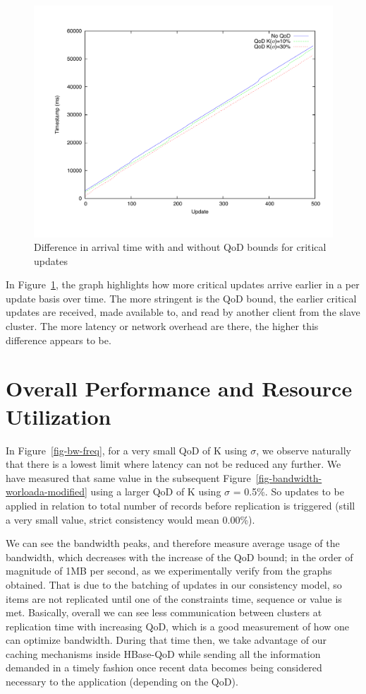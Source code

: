 \begin{figure}[b]
\centering
\includegraphics[width=1.0\textwidth]{figs/timestamps-critical-updates.pdf}
\caption{Difference in arrival time with and without QoD bounds for critical updates}
\label{fig-timestamps-critical-updates}
\end{figure}

In Figure~\ref{fig-timestamps-critical-updates}, the graph highlights how more critical updates arrive earlier in a per update basis over time. The more stringent is the QoD bound, the earlier critical updates are received, made available to, and read by another client from the slave cluster. The more latency or network overhead are there, the higher this difference appears to be.

\section{Overall Performance and Resource Utilization}

In Figure~\ref{fig-bw-freq}, for a very small QoD of K using $\sigma$, we observe naturally that there is a lowest limit where latency can not be reduced any further. We have measured that same value in the subsequent Figure~\ref{fig-bandwidth-worloada-modified} using a larger QoD of K using $\sigma$ = 0.5\%. So updates to be applied in relation to total number of records before replication is triggered (still a very small value, strict consistency would mean 0.00\%).

We can see the bandwidth peaks, and therefore measure average usage of the bandwidth, which decreases with the increase of the QoD bound; in the order of magnitude of 1MB per second, as we experimentally verify from the graphs obtained. That is due to the batching of updates in our consistency model, so items are not replicated until one of the constraints time, sequence or value is met. Basically, overall we can see less communication between clusters at replication time with increasing QoD, which is a good measurement of how one can optimize bandwidth. During that time then, we take advantage of our caching mechanisms inside HBase-QoD while sending all the information demanded in a timely fashion once recent data becomes being considered necessary to the application (depending on the QoD).

